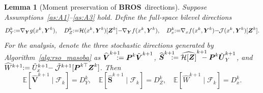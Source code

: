 \documentclass{pkumelon}
\newenvironment{limbox}{\begin{limitationbox}}{\end{limitationbox}}
\theoremstyle{plain}
\newtheorem{lemma}{Lemma}
\newcommand{\E}{\mathbb{E}}
\newcommand{\oursname}{\textnormal{\textbf{BROS}}}
\newcommand{\ours}{\oursname\ }
\begin{document}
\begin{limbox}
\begin{lemma}[Moment preservation of \ours directions]
\label{lem:bros_moment_preservation}
Suppose Assumptions~\ref{as:A1}--\ref{as:A3} hold. Define the full-space bilevel directions
{\small
\begin{equation*}
\begin{aligned}
D_Y^k\hspace{-0.3em}:=\hspace{-0.3em}\nabla_{\boldsymbol Y}g(x^k,\boldsymbol Y^k), \quad D_Z^k\hspace{-0.3em}:=\hspace{-0.3em}\mathcal H(x^k,\boldsymbol Y^k)[\boldsymbol Z^k]\hspace{-0.2em}-\hspace{-0.3em}\nabla_{\boldsymbol Y}f(x^k,\boldsymbol Y^k), \quad D_x^k\hspace{-0.3em}:=\hspace{-0.3em}\nabla_x f(x^k,\boldsymbol Y^k)\hspace{-0.2em}-\hspace{-0.3em}\mathcal J(x^k,\boldsymbol Y^k)[\boldsymbol Z^k].
\end{aligned}
\end{equation*}
}
For the analysis, denote the three stochastic directions generated by Algorithm~\ref{alg:rso_masoba} as $\widehat{\boldsymbol V}^{k+1}\hspace{-0.8em}:=\boldsymbol P^k\tilde{\boldsymbol V}^{k+1}$, $\widehat{\boldsymbol S}^{k+1}\hspace{-0.8em}:=\widehat{\mathcal H[\boldsymbol Z]}^{k+1}\hspace{-1.0em}-\boldsymbol P^k\tilde{\boldsymbol U}_Y^{k+1}$, and $\widehat W^{k+1}\hspace{-0.3em}:=\tilde U_x^{k+1}\hspace{-0.3em}-\tilde{\mathcal J}^{k+1}[\boldsymbol P^{k\top}\boldsymbol Z^k]$. Then
\begin{equation}
\label{eq:main_moment_preservation}
\E[\widehat{\boldsymbol V}^{k+1}\mid\mathcal F_k]=D_Y^k,\quad \E[\widehat{\boldsymbol S}^{k+1}\mid\mathcal F_k]=D_Z^k,\quad \E[\widehat W^{k+1}\mid\mathcal F_k]=D_x^k.
\end{equation}


\end{lemma}
\end{limbox}
\end{document}
